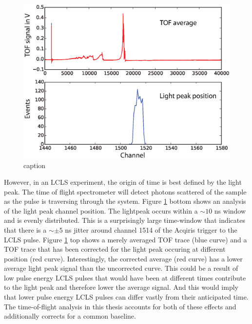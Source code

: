\begin{figure}
	\centering
		\includegraphics[width=1.00\textwidth]{images/TOF-trace-light-peak.eps}
	\caption{caption}
	\label{fig:TOF-trace-light-peak}
\end{figure}
However, in an LCLS experiment, the origin of time is best defined by the light peak. The time of flight spectrometer will detect photons scattered of the sample as the pulse is traversing through the system. Figure \ref{fig:TOF-trace-light-peak} bottom shows an analysis of the light peak channel position. The lightpeak occurs within a $\sim10$ ns window and is evenly distributed. This is a surprisingly large time-window that indicates that there is a $\sim\pm 5$ ns jitter around channel 1514 of the Acqiris trigger to the LCLS pulse. Figure \ref{fig:TOF-trace-light-peak} top shows a merely averaged TOF trace (blue curve) and a TOF trace that has been corrected for the light peak occuring at different position (red curve). Interestingly, the corrected average (red curve) has a lower average light peak signal than the uncorrected curve. This could be a result of low pulse energy LCLS pulses that would have been at different times contribute to the light peak and therefore lower the average signal. And this would imply that lower pulse energy LCLS pulses can differ vastly from their anticipated time.\\
The time-of-flight analysis in this thesis accounts for both of these effects and additionally corrects for a common baseline.
%
%
%
